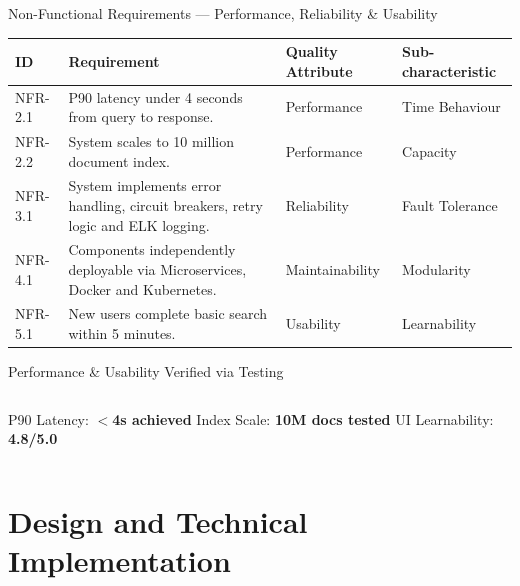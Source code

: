 \documentclass[aspectratio=169,xcolor=dvipsnames]{beamer}
\newcommand{\tw}{\textwidth}
\begin{document}
\begin{frame}{Non-Functional Requirements — Performance, Reliability \& Usability}
  \tiny
  \begin{table}
    \centering\renewcommand{\arraystretch}{1.05}\setlength{\tabcolsep}{3pt}
    \begin{tabular}{p{.06\tw}|p{.43\tw}|p{.14\tw}|p{.26\tw}}
      \toprule
      \textbf{ID} & \textbf{Requirement} & \textbf{Quality Attribute} & \textbf{Sub-characteristic}\\
      \midrule
      NFR-2.1 & P90 latency under 4 seconds from query to response. & Performance & Time Behaviour \\
      NFR-2.2 & System scales to 10 million document index. & Performance & Capacity \\
      NFR-3.1 & System implements error handling, circuit breakers, retry logic and ELK logging. & Reliability & Fault Tolerance \\
      NFR-4.1 & Components independently deployable via Microservices, Docker and Kubernetes. & Maintainability & Modularity \\
      NFR-5.1 & New users complete basic search within 5 minutes. & Usability & Learnability \\
      \bottomrule
    \end{tabular}
  \end{table}
  \vspace{.3em}
  \begin{exampleblock}{Performance \& Usability Verified via Testing}
    \scriptsize
    \begin{columns}[t]
       P90 Latency: \textbf{$<$4s achieved}
       Index Scale: \textbf{10M docs tested}
       UI Learnability: \textbf{4.8/5.0}
    \end{columns}
  \end{exampleblock}
\end{frame}

\section{Design and Technical Implementation}
\end{document}
